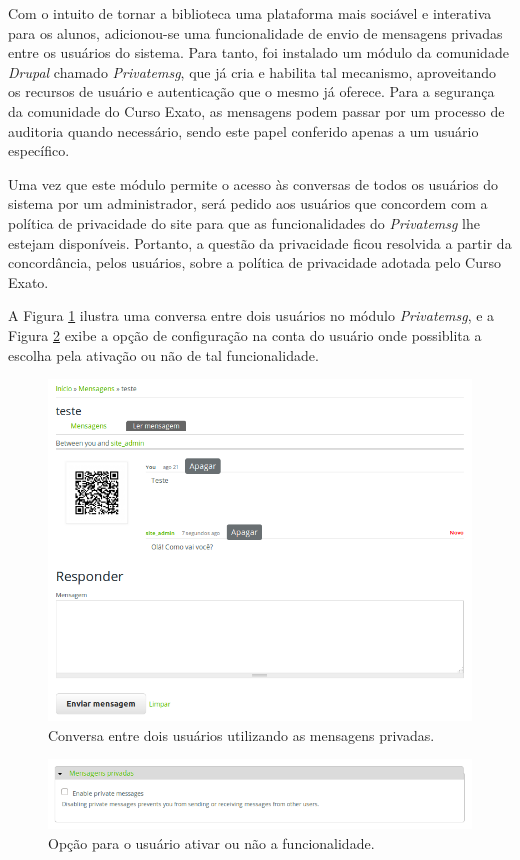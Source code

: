 \documentclass[a4paper]{article}
\begin{document}
Com o intuito de tornar a biblioteca uma plataforma mais sociável e interativa para os alunos, adicionou-se uma funcionalidade de envio de mensagens privadas entre os usuários do sistema. Para tanto, foi instalado um módulo da comunidade \textit{Drupal} chamado \textit{Privatemsg}, que já cria e habilita tal mecanismo, aproveitando os recursos de usuário e autenticação que o mesmo já oferece. Para a segurança da comunidade do Curso Exato, as mensagens podem passar por um processo de auditoria quando necessário, sendo este papel conferido apenas a um usuário específico.

Uma vez que este módulo permite o acesso às conversas de todos os usuários do sistema por um administrador, será pedido aos usuários que concordem com a política de privacidade do site para que as funcionalidades do \textit{Privatemsg} lhe estejam disponíveis. Portanto, a questão da privacidade ficou resolvida a partir da concordância, pelos usuários, sobre a política de privacidade adotada pelo Curso Exato.

A Figura \ref{privatemsg} ilustra uma conversa entre dois usuários no módulo \textit{Privatemsg}, e a Figura \ref{pvtmsg-config} exibe a opção de configuração na conta do usuário onde possiblita a escolha pela ativação ou não de tal funcionalidade.

\begin{figure}[pbth!]
\centering
\includegraphics[width=120mm]{img/privatemsg.png}
\caption{Conversa entre dois usuários utilizando as mensagens privadas.\label{privatemsg}}
\end{figure}

\begin{figure}[pbth!]
\centering
\includegraphics[width=120mm]{img/privatemsg-config.png}
\caption{Opção para o usuário ativar ou não a funcionalidade.\label{pvtmsg-config}}
\end{figure}
\end{document}
